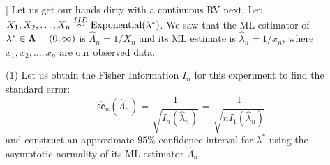 \begin{example}[[Fisher Information of the $\exponential$ Experiment]]\label{EX:ExponentialFisherInfo}
Let us get our hands dirty with a continuous RV next.  Let $X_1,X_2,\ldots,X_n \overset{IID}{\sim} \mbox{{\rm Exponential}}(\lambda^*)$.  We saw that the ML estimator of $\lambda^* \in {\Lambda}\mspace{-11 mu}{\Lambda}=(0,\infty)$ is $\widehat{\Lambda}_n = 1/\overline{X}_n$ and its ML estimate is $\widehat{\lambda}_n=1/\overline{x}_n$, where $x_1,x_2,\ldots,x_n$ are our observed data.

(1) Let us obtain the Fisher Information $I_n$ for this experiment to find the standard error:
\[
\widehat{\mathsf{se}}_n(\widehat{\Lambda}_n) = \frac{1}{\sqrt{I_n(\widehat{\lambda}_n)}}
= \frac{1}{\sqrt{n I_1(\widehat{\lambda}_n)}}
\]
and construct an approximate $95\%$ confidence interval for $\lambda^*$ using the asymptotic normality of its ML estimator $\widehat{\Lambda}_n$.  


\end{example}
